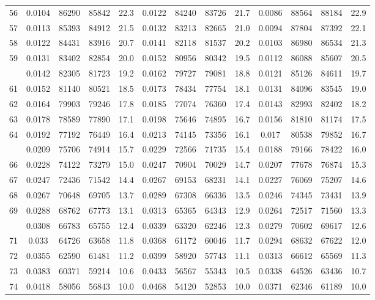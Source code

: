 \documentclass[
  14pt,
]{article}
\begin{document}
\begin{longtable}[t]{lcccccccccccc}
56 & 0.0104 & 86290 & 85842 & 22.3 & 0.0122 & 84240 & 83726 & 21.7 & 0.0086 & 88564 & 88184 & 22.9\\
57 & 0.0113 & 85393 & 84912 & 21.5 & 0.0132 & 83213 & 82665 & 21.0 & 0.0094 & 87804 & 87392 & 22.1\\
58 & 0.0122 & 84431 & 83916 & 20.7 & 0.0141 & 82118 & 81537 & 20.2 & 0.0103 & 86980 & 86534 & 21.3\\
59 & 0.0131 & 83402 & 82854 & 20.0 & 0.0152 & 80956 & 80342 & 19.5 & 0.0112 & 86088 & 85607 & 20.5\\
\addlinespace
60 & 0.0142 & 82305 & 81723 & 19.2 & 0.0162 & 79727 & 79081 & 18.8 & 0.0121 & 85126 & 84611 & 19.7\\
61 & 0.0152 & 81140 & 80521 & 18.5 & 0.0173 & 78434 & 77754 & 18.1 & 0.0131 & 84096 & 83545 & 19.0\\
62 & 0.0164 & 79903 & 79246 & 17.8 & 0.0185 & 77074 & 76360 & 17.4 & 0.0143 & 82993 & 82402 & 18.2\\
63 & 0.0178 & 78589 & 77890 & 17.1 & 0.0198 & 75646 & 74895 & 16.7 & 0.0156 & 81810 & 81174 & 17.5\\
64 & 0.0192 & 77192 & 76449 & 16.4 & 0.0213 & 74145 & 73356 & 16.1 & 0.017 & 80538 & 79852 & 16.7\\
\addlinespace
65 & 0.0209 & 75706 & 74914 & 15.7 & 0.0229 & 72566 & 71735 & 15.4 & 0.0188 & 79166 & 78422 & 16.0\\
66 & 0.0228 & 74122 & 73279 & 15.0 & 0.0247 & 70904 & 70029 & 14.7 & 0.0207 & 77678 & 76874 & 15.3\\
67 & 0.0247 & 72436 & 71542 & 14.4 & 0.0267 & 69153 & 68231 & 14.1 & 0.0227 & 76069 & 75207 & 14.6\\
68 & 0.0267 & 70648 & 69705 & 13.7 & 0.0289 & 67308 & 66336 & 13.5 & 0.0246 & 74345 & 73431 & 13.9\\
69 & 0.0288 & 68762 & 67773 & 13.1 & 0.0313 & 65365 & 64343 & 12.9 & 0.0264 & 72517 & 71560 & 13.3\\
\addlinespace
70 & 0.0308 & 66783 & 65755 & 12.4 & 0.0339 & 63320 & 62246 & 12.3 & 0.0279 & 70602 & 69617 & 12.6\\
71 & 0.033 & 64726 & 63658 & 11.8 & 0.0368 & 61172 & 60046 & 11.7 & 0.0294 & 68632 & 67622 & 12.0\\
72 & 0.0355 & 62590 & 61481 & 11.2 & 0.0399 & 58920 & 57743 & 11.1 & 0.0313 & 66612 & 65569 & 11.3\\
73 & 0.0383 & 60371 & 59214 & 10.6 & 0.0433 & 56567 & 55343 & 10.5 & 0.0338 & 64526 & 63436 & 10.7\\
74 & 0.0418 & 58056 & 56843 & 10.0 & 0.0468 & 54120 & 52853 & 10.0 & 0.0371 & 62346 & 61189 & 10.0\\

\end{longtable}
\end{document}
